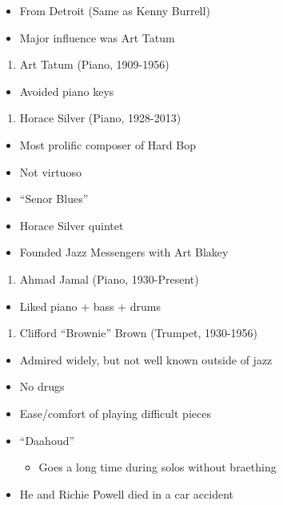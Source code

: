 \documentclass[]{article}
\providecommand{\tightlist}{%
  \setlength{\itemsep}{0pt}\setlength{\parskip}{0pt}}
\begin{document}
\begin{itemize}
\tightlist
\item
  From Detroit (Same as Kenny Burrell)
\item
  Major influence was Art Tatum
\end{itemize}

\begin{enumerate}
\def\labelenumi{\arabic{enumi}.}
\setcounter{enumi}{23}
\tightlist
\item
  Art Tatum (Piano, 1909-1956)
\end{enumerate}

\begin{itemize}
\tightlist
\item
  Avoided piano keys
\end{itemize}

\begin{enumerate}
\def\labelenumi{\arabic{enumi}.}
\setcounter{enumi}{24}
\tightlist
\item
  Horace Silver (Piano, 1928-2013)
\end{enumerate}

\begin{itemize}
\tightlist
\item
  Most prolific composer of Hard Bop
\item
  Not virtuoso
\item
  ``Senor Blues''
\item
  Horace Silver quintet
\item
  Founded Jazz Messengers with Art Blakey
\end{itemize}

\begin{enumerate}
\def\labelenumi{\arabic{enumi}.}
\setcounter{enumi}{25}
\tightlist
\item
  Ahmad Jamal (Piano, 1930-Present)
\end{enumerate}

\begin{itemize}
\tightlist
\item
  Liked piano + bass + drums
\end{itemize}

\begin{enumerate}
\def\labelenumi{\arabic{enumi}.}
\setcounter{enumi}{26}
\tightlist
\item
  Clifford ``Brownie'' Brown (Trumpet, 1930-1956)
\end{enumerate}

\begin{itemize}
\tightlist
\item
  Admired widely, but not well known outside of jazz
\item
  No drugs
\item
  Ease/comfort of playing difficult pieces
\item
  ``Daahoud''

  \begin{itemize}
  \tightlist
  \item
    Goes a long time during solos without braething
  \end{itemize}
\item
  He and Richie Powell died in a car accident
\end{itemize}
\end{document}
